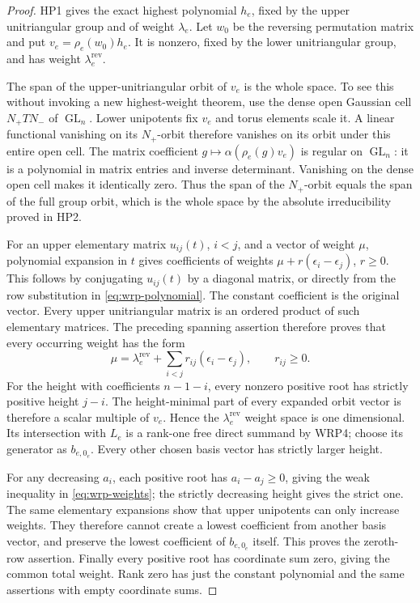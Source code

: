 \documentclass[11pt,a4paper]{article}
\numberwithin{equation}{section}
\theoremstyle{remark}\newtheorem{remark}[theorem]{Remark}
\begin{document}
\begin{proof}
HP1 gives the exact highest polynomial $h_e$, fixed by the
upper unitriangular group and of weight $\lambda_e$.
Let $w_0$ be the reversing permutation matrix and put
$v_e=\rho_e(w_0)h_e$.  It is nonzero, fixed by the lower
unitriangular group, and has weight
$\lambda_e^{\mathrm{rev}}$.

The span of the upper-unitriangular orbit of $v_e$ is the
whole space.  To see this without invoking a new
highest-weight theorem, use the dense open Gaussian cell
$N_+TN_-$ of $\operatorname{GL}_n$.  Lower unipotents fix
$v_e$ and torus elements scale it.  A linear functional
vanishing on its $N_+$-orbit therefore vanishes on its orbit
under this entire open cell.  The matrix coefficient
$g\mapsto\alpha(\rho_e(g)v_e)$ is regular on
$\operatorname{GL}_n$: it is a polynomial in matrix entries
and inverse determinant.  Vanishing on the dense open cell
makes it identically zero.  Thus the span of the $N_+$-orbit
equals the span of the full group orbit, which is the whole
space by the absolute irreducibility proved in HP2.

For an upper elementary matrix $u_{ij}(t)$, $i<j$, and a
vector of weight $\mu$, polynomial expansion in $t$ gives
coefficients of weights
$\mu+r(\epsilon_i-\epsilon_j)$, $r\geq0$.  This follows
by conjugating $u_{ij}(t)$ by a diagonal matrix, or directly
from the row substitution in \eqref{eq:wrp-polynomial}.
The constant coefficient is the original vector.  Every
upper unitriangular matrix is an ordered product of such
elementary matrices.  The preceding spanning assertion
therefore proves that every occurring weight has the form
\[
       \mu=\lambda_e^{\mathrm{rev}}
                 +\sum_{i<j}r_{ij}(\epsilon_i-\epsilon_j),
                         \qquad r_{ij}\geq0.
\]
For the height with coefficients $n-1-i$, every nonzero
positive root has strictly positive height $j-i$.  The
height-minimal part of every expanded orbit vector is
therefore a scalar multiple of $v_e$.  Hence the
$\lambda_e^{\mathrm{rev}}$ weight space is one dimensional.
Its intersection with $L_e$ is a rank-one free direct
summand by WRP4; choose its generator as $b_{e,0_e}$.
Every other chosen basis vector has strictly larger height.

For any decreasing $a_i$, each positive root has
$a_i-a_j\geq0$, giving the weak inequality in
\eqref{eq:wrp-weights}; the strictly decreasing height gives
the strict one.  The same elementary expansions show that
upper unipotents can only increase weights.  They therefore
cannot create a lowest coefficient from another basis
vector, and preserve the lowest coefficient of
$b_{e,0_e}$ itself.  This proves the zeroth-row assertion.
Finally every positive root has coordinate sum zero,
giving the common total weight.  Rank zero has just the
constant polynomial and the same assertions with empty
coordinate sums.
\end{proof}
\end{document}
